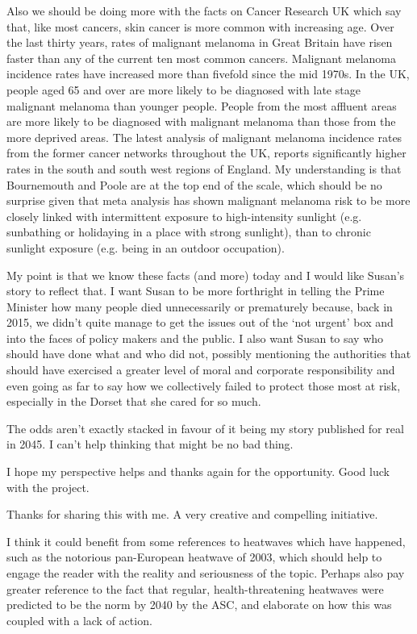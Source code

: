 Also we should be doing more with the facts on Cancer Research UK which say that, like most cancers, skin cancer is more common with increasing age. Over the last thirty years, rates of malignant melanoma in Great Britain have risen faster than any of the current ten most common cancers. Malignant melanoma incidence rates have increased more than fivefold since the mid 1970s. In the UK, people aged 65 and over are more likely to be diagnosed with late stage malignant melanoma than younger people. People from the most affluent areas are more likely to be diagnosed with malignant melanoma than those from the more deprived areas. The latest analysis of malignant melanoma incidence rates from the former cancer networks throughout the UK, reports significantly higher rates in the south and south west regions of England. My understanding is that Bournemouth and Poole are at the top end of the scale, which should be no surprise given that meta analysis has shown malignant melanoma risk to be more closely linked with intermittent exposure to high-intensity sunlight (e.g. sunbathing or holidaying in a place with strong sunlight), than to chronic sunlight exposure (e.g. being in an outdoor occupation).

My point is that we know these facts (and more) today and I would like Susan's story to reflect that. I want Susan to be more forthright in telling the Prime Minister how many people died unnecessarily or prematurely because, back in 2015, we didn't quite manage to get the issues out of the `not urgent' box and into the faces of policy makers and the public. I also want Susan to say who should have done what and who did not, possibly mentioning the authorities that should have exercised a greater level of moral and corporate responsibility and even going as far to say how we collectively failed to protect those most at risk, especially in the Dorset that she cared for so much.

The odds aren't exactly stacked in favour of it being my story published for real in 2045. I can't help thinking that might be no bad thing.

I hope my perspective helps and thanks again for the opportunity. Good luck with the project.

Thanks for sharing this with me. A very creative and compelling initiative.

I think it could benefit from some references to heatwaves which have happened, such as the notorious pan-European heatwave of 2003, which should help to engage the reader with the reality and seriousness of the topic. Perhaps also pay greater reference to the fact that regular, health-threatening heatwaves were predicted to be the norm by 2040 by the ASC, and elaborate on how this was coupled with a lack of action.

